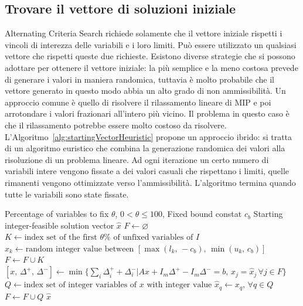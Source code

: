 \subsection{Trovare il vettore di soluzioni iniziale}%
\label{sub:Trovare il vettore di soluzioni iniziale}
Alternating Criteria Search richiede solamente che il vettore iniziale rispetti
i vincoli di interezza delle variabili e i loro limiti.
Può essere utilizzato un qualsiasi vettore che rispetti queste due richieste.
Esistono diverse strategie che si possono adottare per ottenere il vettore
iniziale: la più semplice e la meno costosa prevede di generare i valori in maniera
randomica, tuttavia è molto probabile che il vettore generato in questo modo
abbia un alto grado di non ammissibilità.
Un approccio comune è quello di risolvere il rilassamento
lineare di MIP e poi arrotondare i valori frazionari all'intero più vicino.
Il problema in questo caso è che il rilassamento potrebbe essere 
molto costoso da risolvere.
L'Algoritmo~\ref{alg:startingVectorHeuristic} propone un approccio ibrido:
si tratta di un algoritmo euristico che combina la generazione randomica dei
valori alla risoluzione di un problema lineare.
Ad ogni iterazione un certo numero di variabili intere vengono fissate a dei
valori casuali che rispettano i limiti, quelle rimanenti vengono ottimizzate
verso l'ammissibilità.
L'algoritmo termina quando tutte le variabili sono state fissate.

\begin{algorithm}
    \caption{Vettore iniziale euristico} \label{alg:startingVectorHeuristic}
    \begin{algorithmic}
        \Require Percentage of variables to fix $\theta$, $0 < \theta \leq 100$, Fixed bound constat $c_b$
        \Ensure Starting integer-feasible solution vector $\hat x$
        \State $F \gets \varnothing$
        \State $K \gets \text{index set of the first $\theta\%$ of unfixed variables of $I$}$
        \State $\hat x_k \gets \text{random integer value between } [\max(l_k,\, -c_b),\,\min(u_k,\, c_b)]$ 
        \EndFor
        \State $F \gets F\cup K$
        \State $[x,\, \Delta^+,\, \Delta^-] \gets \min \{\sum_i \Delta_i^+ + \Delta_i^- | Ax + I_m \Delta^+ - I_m \Delta^- = b,\, x_j = \hat x_j\, \forall j \in F\}$
        \State $Q \gets \text{index set of integer variables of $x$ with integer value}$
        \State $\hat x_q \gets x_q,\, \forall q \in Q$
        \State $F \gets F \cup Q$
        \EndWhile
        \State \Return $\hat x$
    \end{algorithmic}
\end{algorithm}

